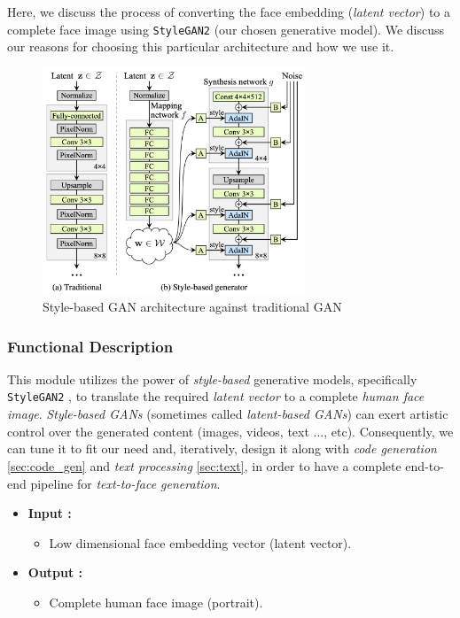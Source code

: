 Here, we discuss the process of converting the face embedding (\emph{latent vector}) to a complete face image using \texttt{StyleGAN2} (our chosen generative model). We discuss our reasons for choosing this particular architecture and how we use it.

\begin{figure}[H]
    \centering
    \includegraphics[width=0.7\textwidth]{images/stylegan.png}
    \caption{Style-based GAN architecture against traditional GAN}
    \label{fig:stylegan}
\end{figure}

\subsubsection{Functional Description}

This module utilizes the power of \emph{style-based} generative models, specifically \texttt{StyleGAN2} \cite{karras2020analyzing}, to translate the required \emph{latent vector} to a complete \emph{human face image}. \emph{Style-based GANs} (sometimes called \emph{latent-based GANs}) can exert artistic control over the generated content (images, videos, text ..., etc). Consequently, we can tune it to fit our need and, iteratively, design it along with \emph{code generation} \ref{sec:code_gen} and \emph{text processing} \ref{sec:text}, in order to have a complete end-to-end pipeline for \emph{text-to-face generation}.

\begin{itemize}
    \item \textbf{Input :}
    \begin{itemize}
        \item Low dimensional face embedding vector (latent vector).
    \end{itemize}
    \item \textbf{Output :}
    \begin{itemize}
        \item Complete human face image (portrait).
    \end{itemize}
\end{itemize}

